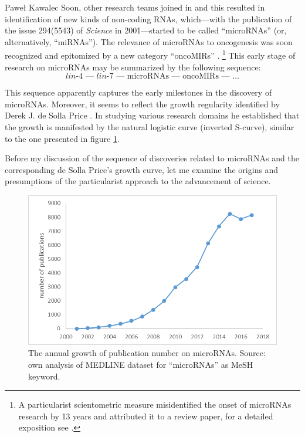 \begin{artengenv}{Paweł Kawalec}
Soon, other research teams joined in and this resulted in identification of new kinds of non-coding RNAs, which---with the publication of the issue 294(5543) of \textit{Science} in 2001---started to be called ``microRNAs'' (or, alternatively, ``miRNAs''). The relevance of microRNAs to oncogenesis was soon recognized
\parencite[][]{calin_frequent_2002} %
 and epitomized by a new category ``oncoMIRs'' 
\parencite[][]{he_oncomir_2019}.%
\footnote{A particularist scientometric measure misidentified the onset of microRNAs research by 13 years and attributed it to a review paper, for a detailed exposition see 
\parencite[][]{giovagnoli_cognitive_2020}.%
} This early stage of research 
\parencite[][]{kawalec_transformations_2018} %
 on microRNAs may be summarized by the following sequence:
$$
\textit{lin-4 –– lin-7}\text{ –– microRNAs –– oncoMIRs –– \ldots}
$$

This sequence apparently captures the early milestones in the discovery of microRNAs. Moreover, it seems to reflect the growth regularity identified by Derek J. de Solla Price
\parencite[de][]{de_solla_price_little_1986}. %
 In studying various research domains he established that the growth is manifested by the natural logistic curve (inverted S-curve), similar to the one presented in figure \ref{fig1kawalec}.

Before my discussion of the sequence of discoveries related to microRNAs and the corresponding de Solla Price's growth curve, let me examine the origins and presumptions of the particularist approach to the advancement of science.
\begin{figure}[h!]
	\includegraphics[width=1\textwidth]{ART_Kawalec/Kawalec-img001.png}
	\caption{The annual growth of publication number on microRNAs. Source: own analysis of MEDLINE dataset for ``microRNAs'' as MeSH keyword.}\label{fig1kawalec}
\end{figure}




\end{artengenv}
